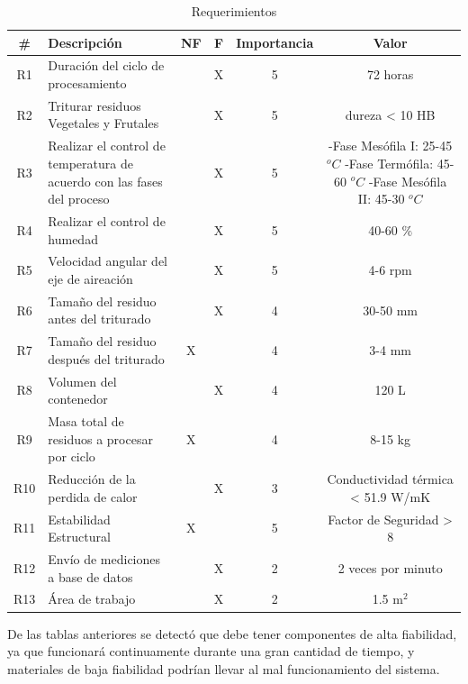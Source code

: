\begin{table}
  \centering
  \begin{tabularx}{\linewidth}{|c|X|c|c|c|c|}
    \hline
    \# & Descripción & NF & F & Importancia & Valor \\
    \hline
    R1 & Duración del ciclo de procesamiento &  & X & 5 & 72 horas \\ \hline
    R2 & Triturar residuos Vegetales y Frutales & & X & 5 & dureza < 10 HB \\ \hline
    R3 & Realizar el control de temperatura de acuerdo con las fases del proceso & & X & 5 & \makecell{ -Fase Mesófila I: 25-45 $^oC$  \\ -Fase Termófila: 45-60 $^oC$ \\ -Fase Mesófila II: 45-30 $^oC$ } \\ \hline
    R4 & Realizar el control de humedad & & X & 5 & 40-60 $\%$ \\ \hline
    R5 & Velocidad angular del eje de aireación & & X & 5 & 4-6 rpm \\ \hline
    R6 & Tamaño del residuo antes del triturado & & X & 4 & 30-50 mm \\ \hline
    R7 & Tamaño del residuo después del triturado & X & & 4 & 3-4 mm \\ \hline
    R8 & Volumen del contenedor & & X & 4 & 120 L \\ \hline
    R9 & Masa total de residuos a procesar por ciclo & X & & 4 & 8-15 kg \\ \hline
    R10 & Reducción de la perdida de calor & & X & 3 & \makecell{ Conductividad térmica \\ < 51.9 W/mK} \\ \hline
    R11 & Estabilidad Estructural & X & & 5 & Factor de Seguridad > 8 \\ \hline
    R12 & Envío de mediciones a base de datos & & X & 2 & 2 veces por minuto\\ \hline
    R13 & Área de trabajo & & X & 2 & 1.5 m$^2$ \\
    \hline
  \end{tabularx}
  \caption{Requerimientos}
  \label{tab:requerimientos}
\end{table}

\clearpage

De las tablas anteriores se detectó que debe tener componentes de alta fiabilidad, ya que funcionará continuamente durante una gran cantidad de tiempo, y materiales de baja fiabilidad podrían llevar al mal funcionamiento del sistema.

\newpage

